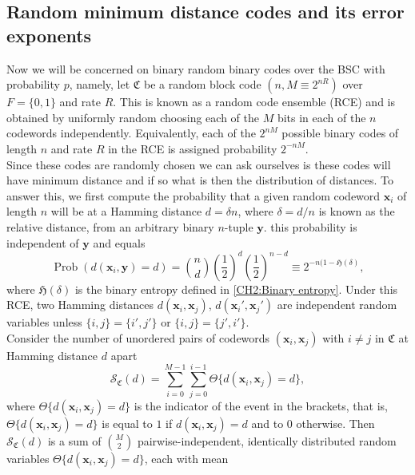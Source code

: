 \subsection{Random minimum distance codes and its error exponents}
Now we will be concerned on binary random binary codes over the BSC with probability $p$, namely, let  $\mathfrak{C}$ be a random block code $(n,M\equiv 2^{nR})$ over $F= \{0,1\}$ and rate $R$. This is known as a random code ensemble (RCE) and is obtained by uniformly random choosing each of the $M$ bits in each of the $n$ codewords independently. Equivalently, each of the $2^{nM}$ possible binary codes of length $n$ and rate $R$ in the RCE is assigned probability $2^{-nM}$.\\
\indent Since these codes are randomly chosen we can ask ourselves is these codes will have minimum distance and if so what is then the distribution of distances. To answer this, we first compute the probability that a given random codeword $\mathbf{x}_i$  of length $n$ will be at a Hamming distance $d=\delta n$, where $\delta=d/n$ is known as the relative distance, from an arbitrary binary $n$-tuple $\mathbf{y}$. this probability is independent of $\mathbf{y}$ and equals \cite{barg_random_2002}
\begin{equation}
\operatorname{Prob}(d(\mathbf{x}_i,\mathbf{y})=d) = {n \choose d}\left(\frac{1}{2} \right)^{d} \left( \frac{1}{2}\right)^{n-d} \equiv 2^{-n(1-\mathfrak{H}(\delta)},
\end{equation}
where $\mathfrak{H}(\delta)$ is the binary entropy defined in \eqref{CH2:Binary entropy}. Under this RCE, two Hamming distances $d(\mathbf{x}_i,\mathbf{x}_j)$, $d(\mathbf{x}_i',\mathbf{x}_j')$ are independent random variables unless $\{i,j\} = \{i',j'\}$ or $\{i,j\}= \{j',i'\}$.\\
\indent Consider the number of unordered pairs of codewords $(\mathbf{x}_i,\mathbf{x}_j)$ with $i\neq j$ in $\mathfrak{C}$ at Hamming distance $d$ apart
\begin{equation}
\mathcal{S}_{\mathfrak{C}}(d) = \sum_{i=0}^{M-1}\sum_{j=0}^{i-1} \Theta\{d(\mathbf{x}_i,\mathbf{x}_j) = d\},
\end{equation}
where $\Theta\{d(\mathbf{x}_i,\mathbf{x}_j) = d\}$ is the indicator of the event in the brackets, that is, $\Theta\{d(\mathbf{x}_i,\mathbf{x}_j) = d\}$ is equal to $1$ if $d(\mathbf{x}_i,\mathbf{x}_j) = d$ and to $0$ otherwise. Then $\mathcal{S}_{\mathfrak{C}}(d)$ is a sum of ${M \choose 2}$ pairwise-independent, identically distributed random variables $\Theta\{d(\mathbf{x}_i,\mathbf{x}_j) = d\}$, each with mean

